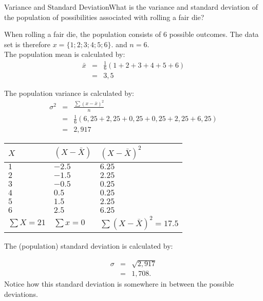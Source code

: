 \begin{wex}{Variance and Standard Deviation}{What is the variance and standard deviation of the population of possibilities associated with rolling a fair die?}
{
When rolling a fair die, the population consists of $6$ possible outcomes. The data set is therefore $x=\{1;2;3;4;5;6\}$. and $n=6$.\\

The population mean is calculated by:
\begin{eqnarray*}
\bar{x} &=& \frac{1}{6}(1+2+3+4+5+6)\\
&=& 3,5
\end{eqnarray*}

The population variance is calculated by:
\begin{eqnarray*}
\sigma^2&=& \frac{\sum(x-\bar{x})^2}{n}\\
&=&\frac{1}{6} (6,25+2,25+0,25+0,25+2,25+6,25)\\
&=& 2,917
\end{eqnarray*}

\begin{center}
\begin{tabular}{|l|l|l|}
\hline
$X$ & $(X - \bar{X})$ & $(X - \bar{X})^2$ \bigstrut \\
\hline
$1$ & $-2.5$ & $6.25$ \\
$2 $& $-1.5 $& $2.25 $\\
$3 $& $-0.5$ & $0.25 $\\
$4 $& $0.5$  & $0.25 $\\
$5$ & $1.5$  & $2.25 $\\
$6$ & $2.5$  & $6.25$ \\
\hline
$\sum{X} = 21$ & $\sum{x} = 0$ & $\sum{(X  - \bar{X})^2} = 17.5$ \bigstrut \\
\hline
\end{tabular}
\end{center}

The (population) standard deviation is calculated by:

\begin{eqnarray*}
\sigma &=& \sqrt{2,917} \\
&=& 1,708.
\end{eqnarray*}
Notice how this standard deviation is somewhere in between the possible deviations.}
\end{wex}

